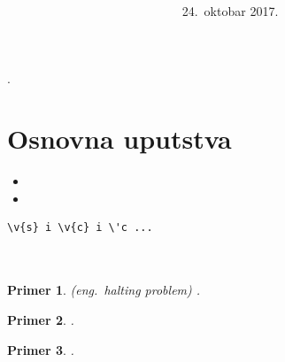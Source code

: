 \documentclass[a4paper]{article}
\newtheorem{primer}{Primer}[section]
\begin{document}
\title{\\ \small{\\\\ }}

\author{\\ }
\date{24.~oktobar 2017.}
\maketitle

.

\section{Osnovna uputstva}
 \textbf{}
\begin{itemize}
\item 
\item 
\end{itemize} 



\begin{verbatim}
\v{s} i \v{c} i \'c ...
\end{verbatim}
	
\begin{verbatim}

\end{verbatim}


\section{}	
\label{sec:termini_i_citiranje}





\begin{primer}
 (eng.~{\em halting problem}) \cite{haltingproblem}.
\end{primer}

\begin{primer}
 \cite{gcc}.
\end{primer}

\begin{primer}
  \cite{laski2009software}. 
\end{primer}
\end{document}
